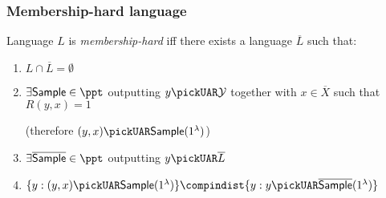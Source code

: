 \subsubsection{Membership-hard language}

\begin{definition}
    Language $L$ is \emph{membership-hard} iff there exists a language $\overline{L}$ such that:
    \begin{enumerate}
        \item $L \cap \overline{L} = \emptyset$
        \item $\exists \textsf{\textup{Sample}} \in \ppt$ outputting $y \pickUAR \mathcal{Y}$ together with $x \in \overline{X}$ such that $R(y, x) = 1$
        
        (therefore $(y, x) \pickUAR \textsf{\textup{Sample}}(1^{\lambda})$)
        \item $\exists \overline{\textsf{\textup{Sample}}} \in \ppt$ outputting $y \pickUAR \overline{L}$
        \item $\{y : (y, x) \pickUAR \textsf{\textup{Sample}}(1^{\lambda})\} \compindist \{y : y \pickUAR \overline{\textsf{\textup{Sample}}}(1^{\lambda})\}$
    \end{enumerate}
    
\end{definition}

